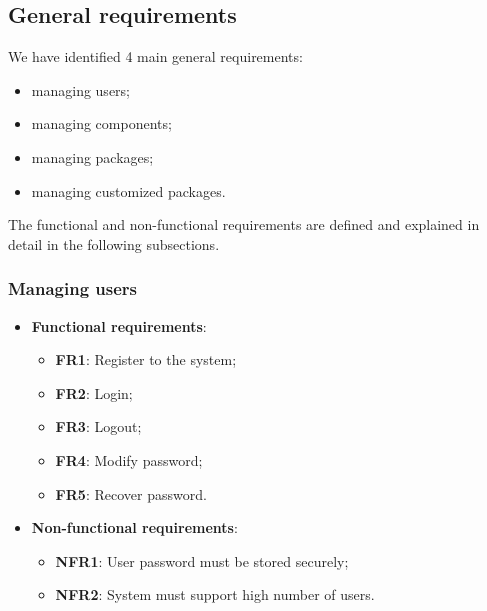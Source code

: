 \documentclass[a4paper,12pt]{book}
\begin{document}
\subsection{General requirements}
We have identified 4 main general requirements:
\begin{itemize}
  \item managing users;
  \item managing components;
  \item managing packages;
  \item managing customized packages.
\end{itemize}

The functional and non-functional requirements are defined and explained in detail in the following subsections.

\subsubsection{Managing users}
\begin{itemize}
  \item \textbf{Functional requirements}:
  \begin{itemize}[noitemsep]
    \item \textbf{FR1}: Register to the system;
    \item \textbf{FR2}: Login;
    \item \textbf{FR3}: Logout;
    \item \textbf{FR4}: Modify password;
    \item \textbf{FR5}: Recover password.
  \end{itemize}
  \item \textbf{Non-functional requirements}:
  \begin{itemize}[noitemsep]
    \item \textbf{NFR1}: User password must be stored securely;
    \item \textbf{NFR2}: System must support high number of users.
  \end{itemize}
\end{itemize}
\end{document}
